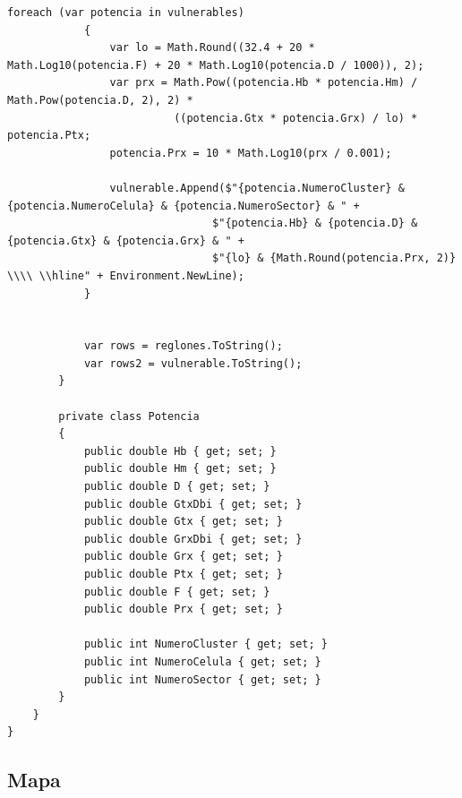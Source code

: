 \documentclass[11pt,letterpaper]{article}
\begin{document}
\begin{lstlisting}[style=CStyle]
            foreach (var potencia in vulnerables)
            {
                var lo = Math.Round((32.4 + 20 * Math.Log10(potencia.F) + 20 * Math.Log10(potencia.D / 1000)), 2);
                var prx = Math.Pow((potencia.Hb * potencia.Hm) / Math.Pow(potencia.D, 2), 2) *
                          ((potencia.Gtx * potencia.Grx) / lo) * potencia.Ptx;
                potencia.Prx = 10 * Math.Log10(prx / 0.001);

                vulnerable.Append($"{potencia.NumeroCluster} & {potencia.NumeroCelula} & {potencia.NumeroSector} & " +
                                $"{potencia.Hb} & {potencia.D} & {potencia.Gtx} & {potencia.Grx} & " +
                                $"{lo} & {Math.Round(potencia.Prx, 2)} \\\\ \\hline" + Environment.NewLine);
            }


            var rows = reglones.ToString();
            var rows2 = vulnerable.ToString();
        }

        private class Potencia
        {
            public double Hb { get; set; }
            public double Hm { get; set; }
            public double D { get; set; }
            public double GtxDbi { get; set; }
            public double Gtx { get; set; }
            public double GrxDbi { get; set; }
            public double Grx { get; set; }
            public double Ptx { get; set; }
            public double F { get; set; }
            public double Prx { get; set; }

            public int NumeroCluster { get; set; }
            public int NumeroCelula { get; set; }
            public int NumeroSector { get; set; }
        }
    }
}

\end{lstlisting}

\newpage
\subsection{Mapa}
\end{document}
